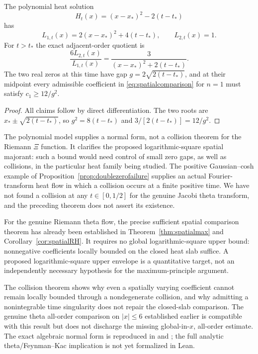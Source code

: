 \begin{proposition}
\label{prop:collisionpair}
The polynomial heat solution
\[
H_t(x)=(x-x_*)^2-2(t-t_*)
\]
has
\[
L_{1,t}(x)=2(x-x_*)^2+4(t-t_*),
\qquad L_{2,t}(x)=1.
\]
For $t>t_*$ the exact adjacent-order quotient is
\begin{equation}\label{eq:pairquotient}
\boxed{\frac{6L_{2,t}(x)}{L_{1,t}(x)}
=\frac{3}{(x-x_*)^2+2(t-t_*)}.}
\end{equation}
The two real zeros at this time have gap
$g=2\sqrt{2(t-t_*)}$, and at their midpoint
every admissible coefficient in \eqref{eq:spatialcomparison}
for $n=1$ must satisfy $c_1\ge12/g^2$.
\end{proposition}
\begin{proof}
All claims follow by direct differentiation.
The two roots are $x_*\pm\sqrt{2(t-t_*)}$,
so $g^2=8(t-t_*)$ and
$3/[2(t-t_*)]=12/g^2$.
\end{proof}

The polynomial model supplies a normal form, not a collision
theorem for the Riemann $\Xi$ function. It clarifies the
proposed logarithmic-square spatial majorant: such a bound
would need control of small zero gaps, as well as collisions,
in the particular heat family being studied. The positive
Gaussian--cosh example of
Proposition~\ref{prop:doublezerofailure} supplies an
actual Fourier-transform heat flow in which a collision
occurs at a finite positive time. We have not found a
collision at any $t\in[0,1/2]$ for the genuine Jacobi
theta transform, and the preceding theorem does not
assert its existence.

For the genuine Riemann theta flow, the precise sufficient
spatial comparison theorem has already been established in
Theorem~\ref{thm:spatialmax} and
Corollary~\ref{cor:spatialRH}. It requires no global
logarithmic-square upper bound: nonnegative coefficients
locally bounded on the closed heat slab suffice.
A proposed logarithmic-square upper envelope is a
quantitative target, not an independently necessary
hypothesis for the maximum-principle argument.

The collision theorem shows why even a spatially varying
coefficient cannot remain locally bounded through a
nondegenerate collision, and why admitting a
nonintegrable time singularity does not repair the
closed-slab comparison.
The genuine theta all-order comparison on $|x|\le6$
established earlier is compatible with this result
but does not discharge the missing global-in-$x$,
all-order estimate. The exact algebraic normal form
is reproduced in
 and
;
the full analytic theta/Feynman--Kac implication is
not yet formalized in Lean.
